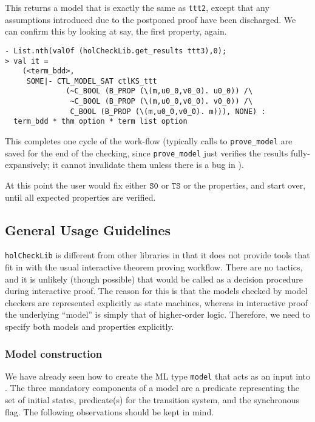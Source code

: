 This returns a model that is exactly the same as \texttt{ttt2}, except that any assumptions introduced due to the postponed proof have been discharged. We can confirm this by looking at say, the first property, again.

\begin{session}\begin{verbatim}
- List.nth(valOf (holCheckLib.get_results ttt3),0);
> val it =
    (<term_bdd>,
     SOME|- CTL_MODEL_SAT ctlKS_ttt
              (~C_BOOL (B_PROP (\(m,u0_0,v0_0). u0_0)) /\
               ~C_BOOL (B_PROP (\(m,u0_0,v0_0). v0_0)) /\
               C_BOOL (B_PROP (\(m,u0_0,v0_0). m))), NONE) :
  term_bdd * thm option * term list option
\end{verbatim}\end{session}

This completes one cycle of the \hc{} work-flow (typically calls to \texttt{prove\_model} are saved for the end of the checking, since  \texttt{prove\_model} just verifies the results fully-expansively; it cannot invalidate them unless there is a bug in \hc{}).

At this point the user would fix either \(\mathtt{S0}\) or \(\mathtt{TS}\) or the properties, and start over, until all expected properties are verified.

\subsection{General Usage Guidelines}

\texttt{holCheckLib} is different from other libraries in that it does not provide tools that fit in with the usual interactive theorem proving workflow. There are no tactics, and it is unlikely (though possible) that \hc{} would be called as a decision procedure during interactive proof. The reason for this is that the models checked by model checkers are represented explicitly as state machines, whereas in \HOL{} interactive proof the underlying ``model'' is simply that of higher-order logic.  Therefore, we need to specify both models and properties explicitly.

\subsubsection{Model construction}\label{sec:models}

We have already seen how to create the ML type \texttt{model} that acts as an input into \hc{}. The three mandatory components of a model are a predicate representing the set of initial states, predicate(s) for the transition system, and the synchronous flag. The following observations should be kept in mind.

